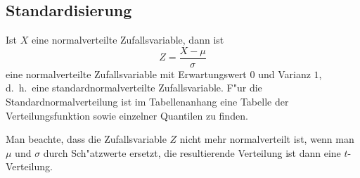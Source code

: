 \subsection{Standardisierung}
Ist $X$ eine normalverteilte Zufallsvariable, dann ist 
\[
Z=\frac{X-\mu}{\sigma}
\]
eine normalverteilte Zufallsvariable mit Erwartungswert $0$ und Varianz $1$,
d.~h.~eine standardnormalverteilte Zufallsvariable.
F"ur die Standardnormalverteilung ist im Tabellenanhang eine Tabelle der
Verteilungsfunktion sowie einzelner Quantilen zu finden.

Man beachte, dass die Zufallsvariable $Z$ nicht mehr normalverteilt ist, wenn man
$\mu$ und $\sigma$ durch Sch"atzwerte ersetzt, die resultierende Verteilung
ist dann eine $t$-Verteilung.
